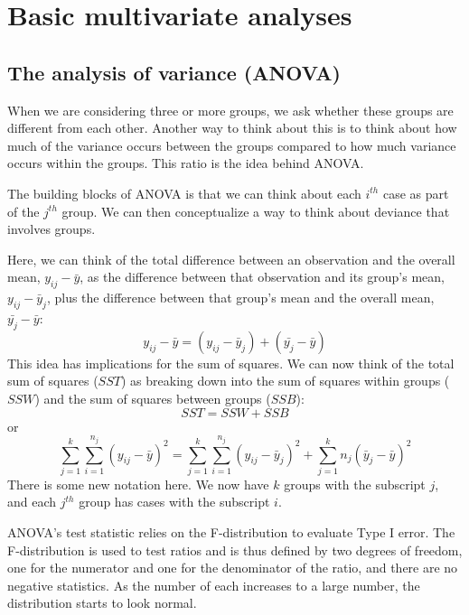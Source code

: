 


\chapter{Basic multivariate analyses}

\section{The analysis of variance (ANOVA)}
When we are considering three or more groups, we ask whether these groups are different from each other. Another way to think about this is to think about how much of the variance occurs between the groups compared to how much variance occurs within the groups. This ratio is the idea behind ANOVA.

The building blocks of ANOVA is that we can think about each $i^{th}$ case as part of the $j^{th}$ group. We can then conceptualize a way to think about deviance that involves groups.

Here, we can think of the total difference between an observation and the overall mean, $y_{ij}-\bar{y}$, as the difference between that observation and its group's mean, $y_{ij}-\bar{y}_j$, plus the difference between that group's mean and the overall mean, $\bar{y_{j}}-\bar{y}$:
\begin{equation}
y_{ij}-\bar{y} = \left(y_{ij}-\bar{y}_j\right)+\left(\bar{y_{j}}-\bar{y}\right)
\end{equation}
This idea has implications for the sum of squares. We can now think of the total sum of squares ($SST$) as breaking down into the sum of squares within groups ($SSW$) and the sum of squares between groups ($SSB$):
\begin{equation}
SST=SSW+SSB
\end{equation}
or
\begin{equation}
\sum_{j=1}^k\sum_{i=1}^{n_j}\left(y_{ij}-\bar{y}\right)^2=\sum_{j=1}^k\sum_{i=1}^{n_j}\left(y_{ij}-\bar{y}_j\right)^2+\sum_{j=1}^kn_j\left(\bar{y}_j-\bar{y}\right)^2
\end{equation}
There is some new notation here. We now have $k$ groups with the subscript $j$, and each $j^{th}$ group has cases with the subscript $i$.

ANOVA's test statistic relies on the F-distribution to evaluate Type I error. The F-distribution is used to test ratios and is thus defined by two degrees of freedom, one for the numerator and one for the denominator of the ratio, and there are no negative statistics.  As the number of each increases to a large number, the distribution starts to look normal.

